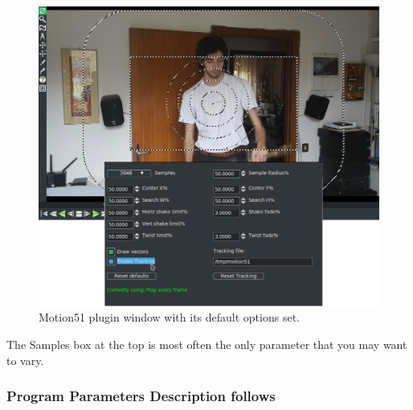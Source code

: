 \begin{figure}[htpb]
    \centering
    \includegraphics[width=0.9\linewidth]{images/motion51.png}
    \caption{Motion51 plugin window with its default options set.}
    \label{fig:motion51}
\end{figure}

The Samples box at the top is most often the only parameter that you may want to vary.

\subsubsection*{Program Parameters Description follows}
\label{ssub:program_parameters_description}

